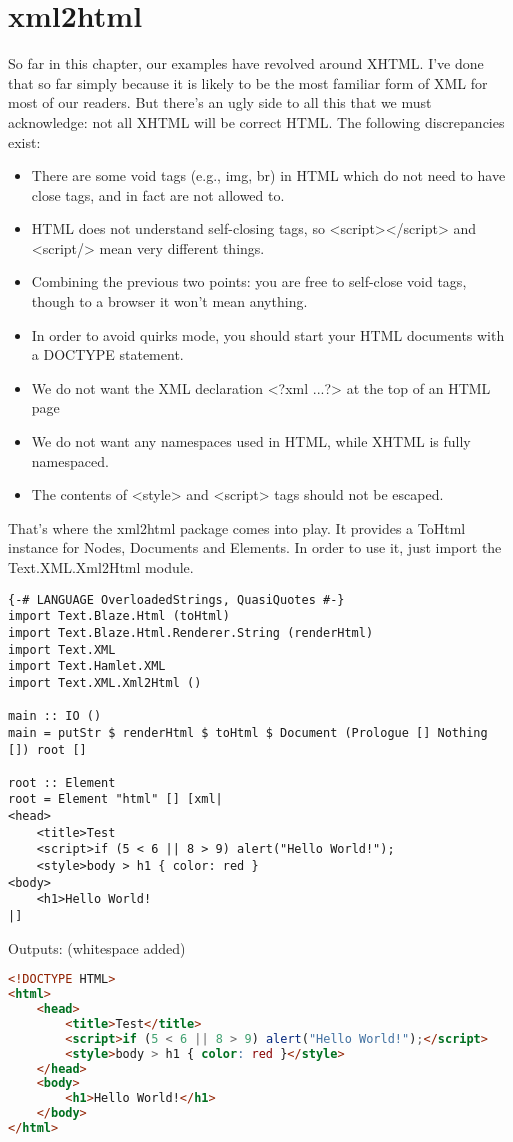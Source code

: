 \section{xml2html}

So far in this chapter, our examples have revolved around XHTML. I've done that so far simply because it is likely to be the most familiar form of XML for most of our readers. But there's an ugly side to all this that we must acknowledge: not all XHTML will be correct HTML. The following discrepancies exist:

\begin{itemize}
\item There are some void tags (e.g., img, br) in HTML which do not need to have close tags, and in fact are not allowed to.
\item HTML does not understand self-closing tags, so <script></script> and
<script/> mean very different things.
\item Combining the previous two points: you are free to self-close void tags, though to a browser it won't mean anything.
\item In order to avoid quirks mode, you should start your HTML documents with a DOCTYPE statement.
\item We do not want the XML declaration <?xml ...?> at the top of an HTML page
\item We do not want any namespaces used in HTML, while XHTML is fully namespaced.
\item The contents of <style> and <script> tags should not be escaped.
\end{itemize}
  
That's where the xml2html package comes into play. It provides a ToHtml instance for Nodes, Documents and Elements. In order to use it, just import the Text.XML.Xml2Html module.

\begin{lstlisting}
{-# LANGUAGE OverloadedStrings, QuasiQuotes #-}
import Text.Blaze.Html (toHtml)
import Text.Blaze.Html.Renderer.String (renderHtml)
import Text.XML
import Text.Hamlet.XML
import Text.XML.Xml2Html ()

main :: IO ()
main = putStr $ renderHtml $ toHtml $ Document (Prologue [] Nothing []) root []

root :: Element
root = Element "html" [] [xml|
<head>
    <title>Test
    <script>if (5 < 6 || 8 > 9) alert("Hello World!");
    <style>body > h1 { color: red }
<body>
    <h1>Hello World!
|]
\end{lstlisting}%

Outputs: (whitespace added)

\begin{lstlisting}[language=HTML]
  <!DOCTYPE HTML>
<html>
    <head>
        <title>Test</title>
        <script>if (5 < 6 || 8 > 9) alert("Hello World!");</script>
        <style>body > h1 { color: red }</style>
    </head>
    <body>
        <h1>Hello World!</h1>
    </body>
</html>
\end{lstlisting}%
